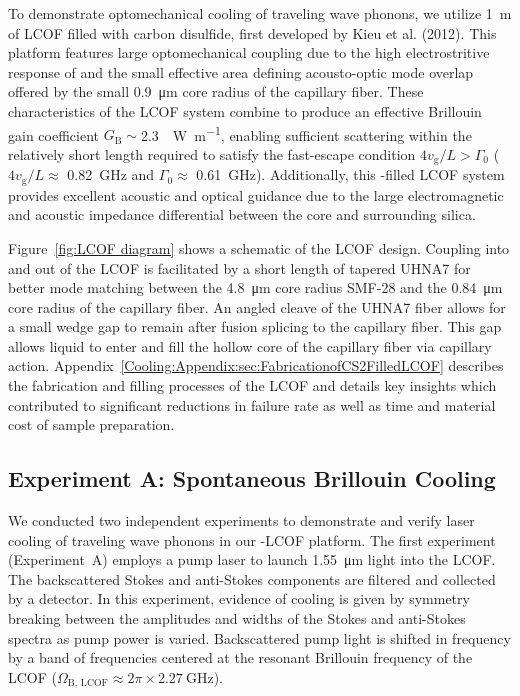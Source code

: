 To demonstrate optomechanical cooling of traveling wave phonons, we utilize \SI{1}{\meter} of \acl{LCOF} filled with carbon disulfide, first developed by Kieu et al. (2012). \cite{kieu2012integrated} This platform features large optomechanical coupling due to the high electrostritive response of  \cite{boyd2020nonlinear} and the small effective area defining acousto-optic mode overlap offered by the small \SI{0.9}{\micro\meter} core radius of the capillary fiber. These characteristics of the \ac{LCOF} system combine to produce an effective Brillouin gain coefficient \(G_{\mathrm{B}} \sim\)\SI{2.3}{\per\watt\per\meter}, enabling sufficient scattering within the relatively short length required to satisfy the fast-escape condition \(4v_{\mathrm{g}}/L > \Gamma_{\mathrm{0}}\) (\(4v_{\mathrm{g}}/L \approx\) \SI{0.82}{\giga\hertz} and \(\Gamma_{\mathrm{0}} \approx\) \SI{0.61}{\giga\hertz}). \cite{johnson2023laser} Additionally, this -filled \ac{LCOF} system provides excellent acoustic and optical guidance due to the large electromagnetic and acoustic impedance differential between the  core and surrounding silica. \cite{behunin2019spontaneous}

Figure~\ref{fig:LCOF diagram} shows a schematic of the \ac{LCOF} design. Coupling into and out of the \ac{LCOF} is facilitated by a short length of tapered \ac{UHNA7} for better mode matching between the \SI{4.8}{\micro\meter} core radius \ac{SMF-28} and the \SI{0.84}{\micro\meter} core radius of the capillary fiber. An angled cleave of the \ac{UHNA7} fiber allows for a small wedge gap to remain after fusion splicing to the capillary fiber. This gap allows liquid  to enter and fill the hollow core of the capillary fiber via capillary action. Appendix~\ref{Cooling:Appendix:sec:FabricationofCS2FilledLCOF} describes the fabrication and filling processes of the \ac{LCOF} and details key insights which contributed to significant reductions in failure rate as well as time and material cost of sample preparation.


\subsection{Experiment A: Spontaneous Brillouin Cooling}
\label{Cooling:subsec:ExperimentASpontaneousBrillouinCooling}

We conducted two independent experiments to demonstrate and verify laser cooling of traveling wave phonons in our -\ac{LCOF} platform. The first experiment (Experiment~A) employs a pump laser to launch \SI{1.55}{\micro\meter} light into the \ac{LCOF}. The backscattered Stokes and anti-Stokes components are filtered and collected by a detector. In this experiment, evidence of cooling is given by symmetry breaking between the amplitudes and widths of the Stokes and anti-Stokes spectra as pump power is varied. Backscattered pump light is shifted in frequency by a band of frequencies centered at the resonant Brillouin frequency of the \ac{LCOF} (\(\Omega_{\mathrm{B,\,LCOF}} \approx 2\pi\times\SI{2.27}{\giga\hertz}\)).

